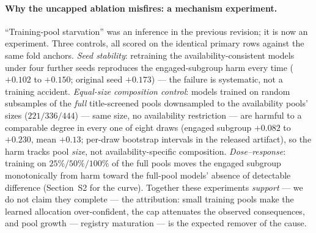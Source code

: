 \documentclass[11pt]{article}
\begin{document}
\paragraph{Why the uncapped ablation misfires: a mechanism experiment.}
``Training-pool starvation'' was an inference in the previous revision; it
is now an experiment. Three controls, all scored on the identical primary
rows against the same fold anchors. \emph{Seed stability}: retraining the
availability-consistent models under four further seeds reproduces the
engaged-subgroup harm every time ($+0.102$ to $+0.150$; original seed
$+0.173$) --- the failure is systematic, not a training accident.
\emph{Equal-size composition control}: models trained on random subsamples
of the \emph{full} title-screened pools downsampled to the availability
pools' sizes ($221/336/444$) --- same size, no availability restriction ---
are harmful to a comparable degree in every one of eight draws (engaged
subgroup $+0.082$ to $+0.230$, mean $+0.13$; per-draw bootstrap intervals
in the released artifact), so the harm tracks pool \emph{size}, not
availability-specific composition. \emph{Dose--response}: training on
$25\%/50\%/100\%$ of the full pools moves the engaged subgroup
monotonically from harm toward the full-pool models' absence of
detectable difference (Section~S2 for the curve). Together these experiments \emph{support} ---
we do not claim they complete --- the attribution: small training
pools make the learned allocation over-confident, the cap attenuates the
observed consequences, and pool growth --- registry maturation --- is the
expected remover of the cause.
\end{document}
